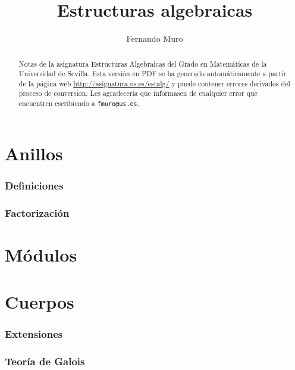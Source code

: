 \documentclass[]{amsart}
\title{Estructuras algebraicas}
\author{Fernando Muro}
\theoremstyle{definition}
\theoremstyle{remark}
\numberwithin{equation}{subsection}
\numberwithin{section}{part}
\begin{document}
\begin{abstract}
Notas de la asignatura Estructuras Algebraicas del Grado en Matemáticas de la Universidad de Sevilla. Esta versión en PDF se ha generado automáticamente a partir de la página web \url{http://asignatura.us.es/estalg/} y puede contener errores derivados del proceso de conversion. Les agradecería que informasen de cualquier error que encuentren escribiendo a \texttt{fmuro@us.es}.
\end{abstract}

\maketitle

\tableofcontents

\part{Anillos}



\section{Definiciones}



\section{Factorización}



\part{Módulos}



\part{Cuerpos}



\section{Extensiones}



\section{Teoría de Galois}


\end{document}
